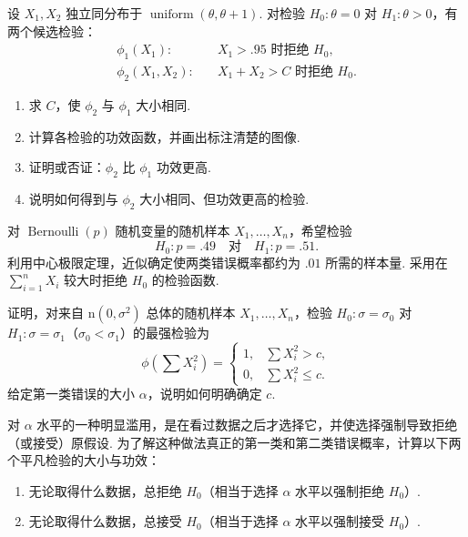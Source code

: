 \begin{exercise}\label{exercise:8.13}
设 $X_1,X_2$ 独立同分布于 $\operatorname{uniform}(\theta,\theta+1)$. 对检验 $H_0:\theta=0$ 对 $H_1:\theta>0$，有两个候选检验：
$$\begin{aligned}\phi_1(X_1):&\quad X_1>.95\text{ 时拒绝 }H_0,\\
\phi_2(X_1,X_2):&\quad X_1+X_2>C\text{ 时拒绝 }H_0.\end{aligned}$$
\begin{enumerate}
\item 求 $C$，使 $\phi_2$ 与 $\phi_1$ 大小相同.
\item 计算各检验的功效函数，并画出标注清楚的图像.
\item 证明或否证：$\phi_2$ 比 $\phi_1$ 功效更高.
\item 说明如何得到与 $\phi_2$ 大小相同、但功效更高的检验.
\end{enumerate}
\end{exercise}
\begin{exercise}\label{exercise:8.14}
对 $\operatorname{Bernoulli}(p)$ 随机变量的随机样本 $X_1,\ldots,X_n$，希望检验
$$H_0:p=.49\quad\text{对}\quad H_1:p=.51.$$
利用中心极限定理，近似确定使两类错误概率都约为 $.01$ 所需的样本量. 采用在 $\sum_{i=1}^nX_i$ 较大时拒绝 $H_0$ 的检验函数.
\end{exercise}
\begin{exercise}\label{exercise:8.15}
证明，对来自 $\mathrm n(0,\sigma^2)$ 总体的随机样本 $X_1,\ldots,X_n$，检验 $H_0:\sigma=\sigma_0$ 对 $H_1:\sigma=\sigma_1$（$\sigma_0<\sigma_1$）的最强检验为
$$\phi\left(\sum X_i^2\right)=\begin{cases}1,&\sum X_i^2>c,\\0,&\sum X_i^2\le c.\end{cases}$$
给定第一类错误的大小 $\alpha$，说明如何明确确定 $c$.
\end{exercise}
\begin{exercise}\label{exercise:8.16}
对 $\alpha$ 水平的一种明显滥用，是在看过数据之后才选择它，并使选择强制导致拒绝（或接受）原假设. 为了解这种做法真正的第一类和第二类错误概率，计算以下两个平凡检验的大小与功效：
\begin{enumerate}
\item 无论取得什么数据，总拒绝 $H_0$（相当于选择 $\alpha$ 水平以强制拒绝 $H_0$\mbox{）.}
\item 无论取得什么数据，总接受 $H_0$（相当于选择 $\alpha$ 水平以强制接受 $H_0$\mbox{）.}
\end{enumerate}
\end{exercise}

